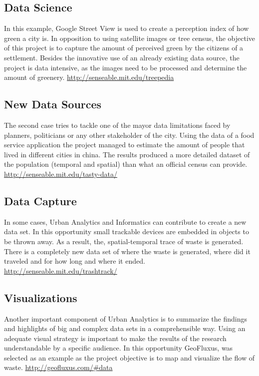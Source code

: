\subsection{Data Science}
In this example, Google Street View is used to create a perception index of how green a city is. In opposition to using satellite images or tree census, the objective of this project is to capture the amount of perceived green by the citizens of a settlement. Besides the innovative use of an already existing data source, the project is data intensive, as the images need to be processed and determine the amount of greenery.
\url{http://senseable.mit.edu/treepedia}




\subsection{New Data Sources}
The second case tries to tackle one of the mayor data limitations faced by planners, politicians or any other stakeholder of the city. Using the data of a food service application the project managed to estimate the amount of people that lived in different cities in china. The results produced a more detailed dataset of the population (temporal and spatial) than what an official census can provide.
\url{http://senseable.mit.edu/tasty-data/}

\subsection{Data Capture}
In some cases, Urban Analytics and Informatics can contribute to create a new data set. In this opportunity small trackable devices are embedded in objects to be thrown away. As a result, the, spatial-temporal trace of waste is generated. There is a completely new data set of where the waste is generated, where did it traveled and for how long and where it ended. 
\url{http://senseable.mit.edu/trashtrack/}




\subsection{Visualizations}
Another important component of Urban Analytics is to summarize the findings and highlights of big and complex data sets in a comprehensible way. Using an adequate visual strategy is important to make the results of the research understandable by a specific audience. In this opportunity GeoFluxus, was selected as an example as the project objective is to map and visualize the flow of waste.
\url{http://geofluxus.com/#data}


